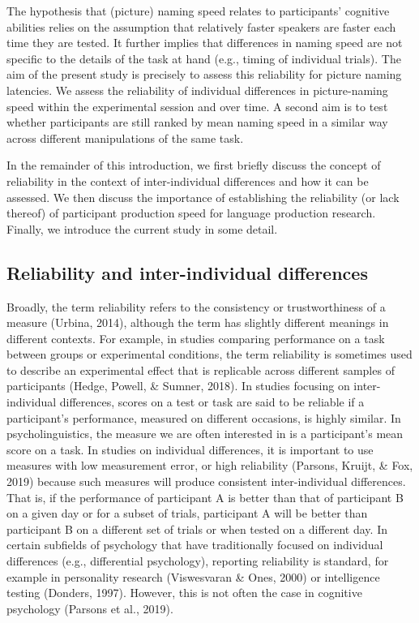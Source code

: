 \documentclass[
  man,floatsintext]{apa6}
\begin{document}
The hypothesis that (picture) naming speed relates to participants' cognitive abilities relies on the assumption that relatively faster speakers are faster each time they are tested. It further implies that differences in naming speed are not specific to the details of the task at hand (e.g., timing of individual trials). The aim of the present study is precisely to assess this reliability for picture naming latencies. We assess the reliability of individual differences in picture-naming speed within the experimental session and over time. A second aim is to test whether participants are still ranked by mean naming speed in a similar way across different manipulations of the same task.

In the remainder of this introduction, we first briefly discuss the concept of reliability in the context of inter-individual differences and how it can be assessed. We then discuss the importance of establishing the reliability (or lack thereof) of participant production speed for language production research. Finally, we introduce the current study in some detail.

\hypertarget{reliability-and-inter-individual-differences}{%
\subsection{Reliability and inter-individual differences}\label{reliability-and-inter-individual-differences}}

Broadly, the term reliability refers to the consistency or trustworthiness of a measure (Urbina, 2014), although the term has slightly different meanings in different contexts. For example, in studies comparing performance on a task between groups or experimental conditions, the term reliability is sometimes used to describe an experimental effect that is replicable across different samples of participants (Hedge, Powell, \& Sumner, 2018). In studies focusing on inter-individual differences, scores on a test or task are said to be reliable if a participant's performance, measured on different occasions, is highly similar. In psycholinguistics, the measure we are often interested in is a participant's mean score on a task. In studies on individual differences, it is important to use measures with low measurement error, or high reliability (Parsons, Kruijt, \& Fox, 2019) because such measures will produce consistent inter-individual differences. That is, if the performance of participant A is better than that of participant B on a given day or for a subset of trials, participant A will be better than participant B on a different set of trials or when tested on a different day. In certain subfields of psychology that have traditionally focused on individual differences (e.g., differential psychology), reporting reliability is standard, for example in personality research (Viswesvaran \& Ones, 2000) or intelligence testing (Donders, 1997). However, this is not often the case in cognitive psychology (Parsons et al., 2019).
\end{document}
